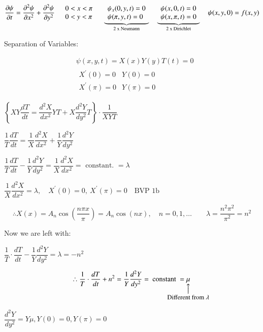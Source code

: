 \documentclass{report}
\makeatletter
\newcommand\parrow[3][3ex]{%
 \begin{array}[t]{@{}c@{}} #2 \\
  \left\uparrow\vcenter{\hrule height #1}\right.\kern-\nulldelimiterspace\\
  \makebox[0pt]{\small#3}
  \end{array}%
}
\makeatother
\begin{document}
$$
\dfrac{\partial \psi}{\partial t}=\dfrac{\partial^{2} \psi}{\partial x^{2}}+\dfrac{\partial^{2} \psi}{\partial y^{2}}\quad 
\begin{array}[c]{l}
     0<x<\pi \\
     0<y<\pi 
\end{array}\quad 
\underbrace{
\begin{array}[c]{l}
     \psi_x(0,y,t)=0\\
     \psi(\pi,y,t)=0 
\end{array}
}_{\text{2 x Neumann}}\quad 
\underbrace{
\begin{array}[c]{l}
     \psi(x,0,t)=0\\
     \psi(x,\pi,t)=0 
\end{array}
}_{\text{2 x Dirichlet}}\quad \psi(x,y,0)=f(x,y)
$$


Separation of Variables:

$$
\begin{aligned}
& \psi(x, y, t)=X(x) Y(y) T(t)=0 \\
& \begin{array}{ll}
    X^{\prime}(0)=0 & Y(0)=0 \\
    X^{\prime}(\pi)=0 & Y(\pi)=0 
\end{array}
\end{aligned}
$$

$\left\{X Y \dfrac{d T}{d t}=\dfrac{d^{2} X}{d x^{2}} Y T+X \dfrac{d^{2} Y}{d y^{2}} T\right\} \cdot \dfrac{1}{X Y T}$

$\dfrac{1}{T} \dfrac{d T}{d t}=\dfrac{1}{X} \dfrac{d^{2} X}{d x^{2}}+\dfrac{1}{Y} \dfrac{d^{2} Y}{d y^{2}}$

$\dfrac{1}{T} \dfrac{d T}{d t}-\dfrac{1}{Y} \dfrac{d^{2} Y}{d y^{2}}=\dfrac{1}{X} \dfrac{d^{2} X}{d x^{2}}=\text { constant. }=\lambda$

$\dfrac{1}{X} \dfrac{d^{2} X}{d x^{2}}=\lambda,\quad X^{\prime}(0)=0,\ X^{\prime}(\pi)=0\quad \text{BVP 1b}$

$$
\therefore X(x)=A_{n} \cos \left(\frac{n \pi x}{\pi}\right)
=A_{n} \cos (n x),\quad n=0,1,\ldots \qquad \lambda=\frac{n^{2}\pi^{2}}{\pi^{2}}=n^{2}
$$

Now we are left with:

$\dfrac{1}{T} \cdot \dfrac{d T}{d t}-\dfrac{1}{Y} \dfrac{d^{2} Y}{d y^{2}}=\lambda=-n^{2}$

$$\therefore \dfrac{1}{T} \cdot \dfrac{d T}{d t}+n^{2}=\dfrac{1}{Y} \dfrac{d^{2} Y}{d y^{2}}=\text { constant }=\parrow{\mu}{Different from $\lambda$}$$

$\dfrac{d^{2} Y}{d y^{2}}=Y \mu, Y(0)=0, Y(\pi)=0 \quad$ 
\end{document}
